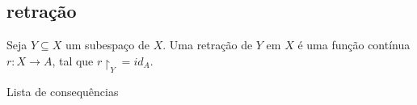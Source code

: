 \subsection{retração}
\label{retração-def}
\begin{defi}[Retração]
Seja $Y \subseteq X$ um subespaço de $X$. Uma retração de $Y$ em $X$ é uma função contínua $r:X \to A$, tal que $r\restriction_Y = id_A$.	 
\end{defi}

\begin{titlemize}{Lista de consequências}
	\item \hyperref[teo-ponto-fixo-brower]{}
\end{titlemize}
